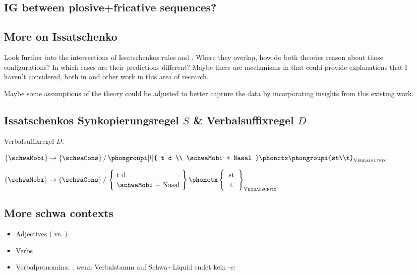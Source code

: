 

\subsection{IG between plosive+fricative sequences?}


\subsection{More on Issatschenko  \CVCV}
Look further into the intersections of Issatschenkos rules
and \CVCV. Where they overlap, how do both theories reason about those configurations?
In which cases are their predictions different?
Maybe there are mechanisms in \CVCV that could provide explanations that I haven't considered,
both in \cite{scheer2004} and other work in this area of research.

Maybe some assumptions of the theory could be adjusted to better capture the data
by incorporating insights from this existing work.



\subsection{Issatschenkos Synkopierungsregel $S$ \& Verbalsuffixregel $D$}

Verbalsuffixregel $D$:

\(
  \{\schwaMobi\} \to \{\schwaCons\} \,/\,
  \phongroupi[l]{ t d \\ \schwaMobi + Nasal } \phonctx \phongroupi{st\\t}_\textsc{Verbalsuffix}
\)

\(
  \{\schwaMobi\} \to \{\schwaCons\} \,/\,
  \renewcommand{\arraystretch}{1.2}%
  \left\{
    \begin{tabular}{@{\ }l@{\ }}t d\\\schwaMobi + Nasal\end{tabular}
  \right\}
  \phonctx
  \left\{
    \begin{tabular}{c}st\\t\end{tabular}
  \right\}_\textsc{Verbalsuffix}
\)


\subsection{More schwa contexts}
\begin{itemize}
\item Adjectives ( vs. )
\item Verbs
\item Verbalpronomina: ,
  wenn Verbalstamm auf Schwa+Liquid endet kein -e:
\end{itemize}


